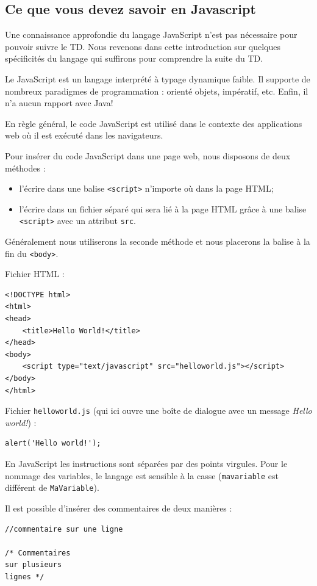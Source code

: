 \documentclass[11pt]{article}
\newcommand{\code}[1]{\lstinline{#1}}
\begin{document}
\subsection*{Ce que vous devez savoir en Javascript}
Une connaissance approfondie du langage JavaScript n'est pas nécessaire pour pouvoir suivre le TD.
Nous revenons dans cette introduction sur quelques spécificités du langage qui suffirons pour comprendre la suite du TD.

Le JavaScript est un langage interprété à typage dynamique faible. 
Il supporte de nombreux paradigmes de programmation : orienté objets, impératif, etc. 
Enfin, il n'a aucun rapport avec Java!

En règle général, le code JavaScript est utilisé dans le contexte des applications web où il est exécuté dans les navigateurs.

Pour insérer du code JavaScript dans une page web, nous disposons de deux méthodes :
\begin{itemize}
	\item l'écrire dans une balise \code{<script>} n'importe où dans la page HTML;
	\item l'écrire dans un fichier séparé qui sera lié à la page HTML grâce à une balise \code{<script>} avec un attribut \code{src}.
\end{itemize}

Généralement nous utiliserons la seconde méthode et nous placerons la balise à la fin du \code{<body>}.

Fichier HTML :
\begin{lstlisting}
<!DOCTYPE html>
<html>
<head>
    <title>Hello World!</title>
</head>
<body>
	<script type="text/javascript" src="helloworld.js"></script>
</body>
</html>
\end{lstlisting}

Fichier \code{helloworld.js} (qui ici ouvre une boîte de dialogue avec un message \textit{Hello world!}) :
\begin{lstlisting}
alert('Hello world!');
\end{lstlisting}

En JavaScript les instructions sont séparées par des points virgules. 
Pour le nommage des variables, le langage est sensible à la casse (\code{mavariable} est différent de \code{MaVariable}).

Il est possible d'insérer des commentaires de deux manières :
\begin{lstlisting}
//commentaire sur une ligne

/* Commentaires
sur plusieurs
lignes */
\end{lstlisting}
\end{document}
